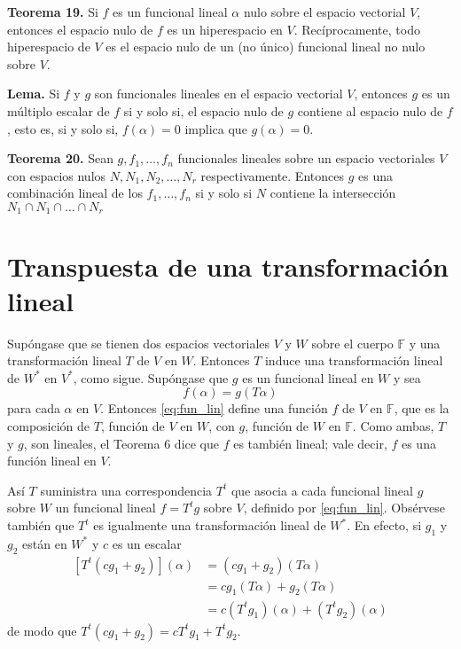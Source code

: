 \newpage
\textbf{Teorema 19.} Si $f$ es un funcional lineal $\alpha$ nulo
sobre el espacio vectorial $V$, entonces el espacio nulo de $f$
es un hiperespacio en $V$. Recíprocamente, todo hiperespacio de $V$
es el espacio nulo de un (no único) funcional lineal no nulo
sobre $V$.

\textbf{Lema.} Si $f$ y $g$ son funcionales lineales en el
espacio vectorial $V$, entonces $g$ es un múltiplo escalar
de $f$ si y solo si, el espacio nulo de $g$ contiene al espacio
nulo de $f$, esto es, si y solo si, $f(\alpha) = 0$ implica
que $g(\alpha) = 0$.

\textbf{Teorema 20.} Sean $g, f_{1},\dots, f_{n}$ funcionales lineales
sobre un espacio vectoriales $V$ con espacios nulos $N, N_{1}, N_{2},\dots, N_{r}$
respectivamente. Entonces $g$ es  una combinación lineal de los
$f_{1},\dots, f_{n}$ si y solo si $N$ contiene la intersección
$N_{1}\cap N_{1}\cap\dots\cap N_{r}$

\section{{\Large Transpuesta de una transformación lineal}}

Supóngase que se tienen dos espacios vectoriales $V$ y $W$ sobre
el cuerpo $\mathbb{F}$ y una transformación lineal $T$ de $V$ en $W$.
Entonces $T$ induce una transformación lineal de $W^{\ast}$ en
$V^{\ast}$, como sigue. Supóngase que $g$ es un funcional lineal
en $W$ y sea
\begin{equation}\label{eq:fun_lin}
    f(\alpha)=g(T\alpha)
\end{equation}
para cada $\alpha$ en $V$. Entonces \eqref{eq:fun_lin} deﬁne una
función $f$ de $V$ en $\mathbb{F}$, que es la composición de $T$,
función de $V$ en $W$, con $g$, función de $W$ en $\mathbb{F}$.
Como ambas, $T$ y $g$, son lineales, el Teorema 6 dice que $f$
es también lineal; vale decir, $f$ es una función lineal en $V$.

Así $T$ suministra una correspondencia $T^{t}$ que asocia a
cada funcional lineal $g$ sobre $W$ un funcional lineal
$f = T^{t}g$ sobre $V$, deﬁnido por \eqref{eq:fun_lin}.
Obsérvese también que $T^{t}$ es igualmente una transformación
lineal de $W^{\ast}$. En efecto, si $g_{1}$ y $g_{2}$ están en
$W^{\ast}$ y $c$ es un escalar
\begin{align*}\label{eq:fun_lin_tras}
    [T^{t}(cg_{1} + g_{2})](\alpha)&=(cg_{1} + g_{2})(T\alpha)\\
    &=cg_{1}(T\alpha) + g_{2}(T\alpha)\\
    &=c(T^{t}g_{1})(\alpha) + (T^{t}g_{2})(\alpha)
\end{align*}
de modo que $T^{t}(cg_{1} + g_{2}) = cT^{t}g_{1} + T^{t}g_{2}$.